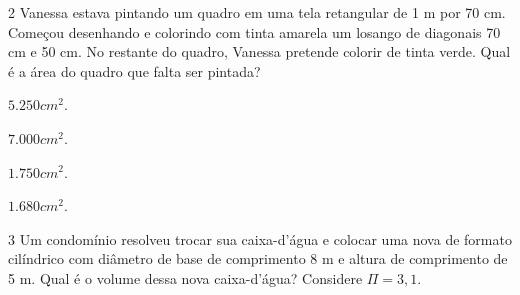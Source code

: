 \num{2} Vanessa estava pintando um quadro em uma tela retangular de 1 m por
70 cm. Começou desenhando e colorindo com tinta amarela um losango de
diagonais 70 cm e 50 cm. No restante do quadro, Vanessa pretende colorir
de tinta verde. Qual é a área do quadro que falta ser pintada?


\begin{escolha}[itemsep=0pt]
\item $5.250 cm^2$.
\item $7.000 cm^2$.
\item $1.750 cm^2$.
\item $1.680 cm^2$.
\end{escolha}

















\num{3} Um condomínio resolveu trocar sua caixa-d'água e colocar uma nova de
formato cilíndrico com diâmetro de base de comprimento 8 m e altura de
comprimento de 5 m. Qual é o volume dessa nova caixa-d'água? Considere $\Pi = 3,1$.


